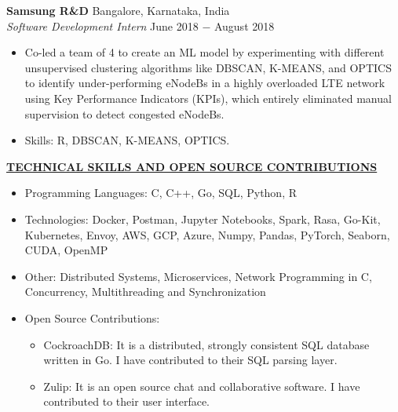 \documentclass{article}
\begin{document}
\noindent \textbf{Samsung R\&D} \hfill Bangalore, Karnataka, India \\
\textit{Software Development Intern} \hfill June 2018 $-$ August 2018
\begin{itemize}[noitemsep,nolistsep,leftmargin=*]
\item {Co-led a team of 4 to create an ML model by experimenting with different unsupervised clustering algorithms like DBSCAN, K-MEANS, and OPTICS to identify under-performing eNodeBs in a highly overloaded LTE network using Key Performance Indicators (KPIs), which entirely eliminated manual supervision to detect congested eNodeBs.}
\item{Skills: R, DBSCAN, K-MEANS, OPTICS.\\}
\end{itemize}

\noindent \textbf{\underline{TECHNICAL SKILLS AND OPEN SOURCE CONTRIBUTIONS}}
\begin{itemize}[noitemsep,nolistsep,leftmargin=*]
\item {Programming Languages: C, C++, Go, SQL, Python, R}
\item {Technologies: Docker, Postman, Jupyter Notebooks, Spark, Rasa, Go-Kit, Kubernetes, Envoy, AWS, GCP, Azure, Numpy, Pandas, PyTorch, Seaborn, CUDA, OpenMP}
\item {Other: Distributed Systems, Microservices, Network Programming in C, Concurrency, Multithreading and Synchronization}
\item {Open Source Contributions:}
\begin{itemize}
    \item CockroachDB: It is a distributed, strongly consistent SQL database written in Go. I have contributed to their SQL parsing layer. 
    \item Zulip: It is an open source chat and collaborative software. I have contributed to their user interface.
\end{itemize}
\end{itemize}

%
%
\end{document}
